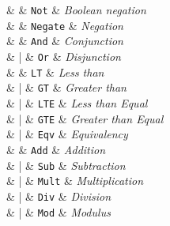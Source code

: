 \begin{syntax}
  \neg & \Coloneqq{} & \texttt{Not}    & \emph{Boolean negation} \\
  [1.5ex]
  \integerUnary & \Coloneqq{} & \texttt{Negate} & \emph{Negation} \\
  [1.5ex]

  \boolFuncs & \Coloneqq{} & \texttt{And} & \textit{Conjunction} \\
                      &      |      & \texttt{Or}  & \textit{Disjunction} \\
  [1.5ex]

  \inequalities & \Coloneqq{} & \texttt{LT}   & \textit{Less than} \\
                      &     |       & \texttt{GT}   & \textit{Greater than} \\
                      &     |       & \texttt{LTE}  & \textit{Less than Equal} \\
                      &     |       & \texttt{GTE}  & \textit{Greater than Equal} \\
                      &     |       & \texttt{Eqv}  & \textit{Equivalency} \\
  [1.5ex]

  \integerFuncs & \Coloneqq{} & \texttt{Add}   & \textit{Addition} \\
                      &     |       & \texttt{Sub}   & \textit{Subtraction} \\
                      &     |       & \texttt{Mult}  & \textit{Multiplication} \\
                      &     |       & \texttt{Div}  & \textit{Division} \\
                      &     |       & \texttt{Mod}  & \textit{Modulus} \\
\end{syntax}

